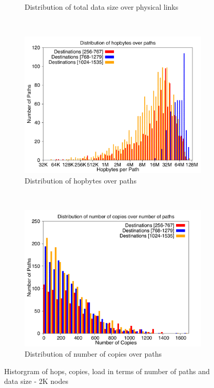\begin{figure}[!htbp]
\begin{subfigure}[b]{0.49\textwidth}
                \caption{Distribution of total data size over physical links}
                \label{fig:incrdist_2k_loaddata}
        \end{subfigure}
        ~ %
        \begin{subfigure}[b]{0.49\textwidth}
                \includegraphics[width=\textwidth]{report_figures/incrdist/2k/hopbyte_histo.pdf}
                \caption{Distribution of hopbytes over paths}
                \label{fig:incrdist_2k_hopbyte}
        \end{subfigure}
        ~ %
        \begin{subfigure}[b]{0.49\textwidth}
                \includegraphics[width=\textwidth]{report_figures/incrdist/2k/hopcopy_histo.pdf}
                \caption{Distribution of number of copies over paths}
                \label{fig:incrdist_2k_hopcopy}
        \end{subfigure}
        \caption{Historgram of hops, copies, load in terms of number of paths and data size - 2K nodes}
        \label{fig:incrdist_2k_histo}
\end{figure}

